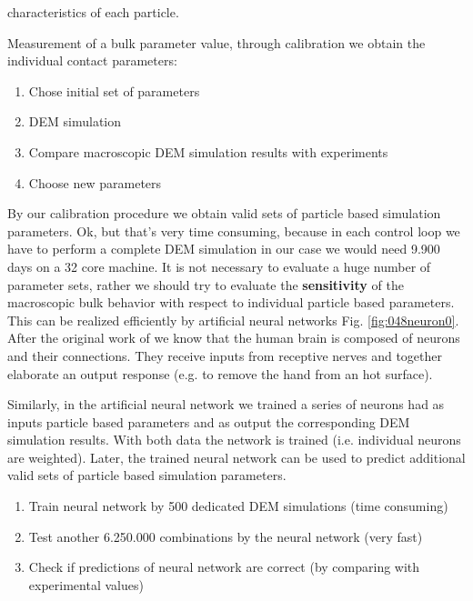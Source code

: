 characteristics of each particle.

Measurement of a bulk parameter value, through calibration we obtain the
individual contact parameters:
\begin{enumerate}
\item{Chose initial set of parameters}
\item{DEM simulation}
\item{Compare macroscopic DEM simulation results with experiments}
\item{Choose new parameters}
\end{enumerate}
By our calibration procedure we obtain valid sets of particle based simulation parameters.
Ok, but that's very time consuming, because in each control loop we have to
perform a complete \acs{DEM} simulation in our case we would need 9.900 days on a 32
core machine. It is not necessary to evaluate a huge number of parameter sets,
rather we should try to evaluate the \textbf{sensitivity} 
of the macroscopic bulk behavior with respect to individual particle based parameters.
This can be realized efficiently by artificial neural networks Fig.
\ref{fig:048neuron0}. 
After the original work of \citet{RefWorks:189} we know that the human brain is
composed of neurons and their connections. They receive inputs from receptive
nerves and together elaborate an output response (e.g. to remove the hand from
an hot surface).

Similarly, in the artificial neural network we trained a series of neurons had
as inputs particle based parameters and as output the corresponding \acs{DEM}
simulation results.
With both data the network is trained (i.e. individual neurons are
weighted).
Later, the trained neural network can be used to predict additional valid sets of particle based simulation parameters. 

\begin{enumerate}
\item{Train neural network by 500 dedicated DEM simulations (time consuming)}
\item{Test another 6.250.000 combinations by the neural network (very fast)}
\item{Check if predictions of neural network are correct (by comparing with experimental  values)}
\end{enumerate}

